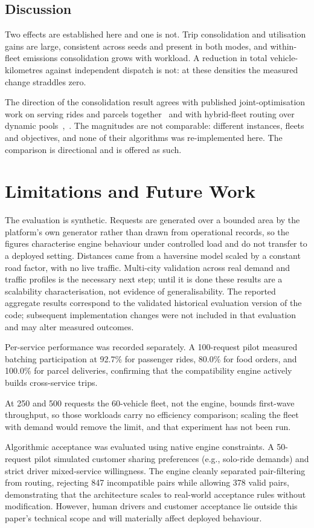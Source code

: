 \documentclass[conference]{IEEEtran}
\begin{document}
\subsection{Discussion}
Two effects are established here and one is not. Trip consolidation and utilisation gains are large, consistent across seeds and present in both modes, and within-fleet emissions consolidation grows with workload. A reduction in total vehicle-kilometres against independent dispatch is not: at these densities the measured change straddles zero.

The direction of the consolidation result agrees with published joint-optimisation work on serving rides and parcels together~\cite{ref3} and with hybrid-fleet routing over dynamic pools~\cite{ref9},~\cite{ref10}. The magnitudes are not comparable: different instances, fleets and objectives, and none of their algorithms was re-implemented here. The comparison is directional and is offered as such.

\section{Limitations and Future Work}
The evaluation is synthetic. Requests are generated over a bounded area by the platform's own generator rather than drawn from operational records, so the figures characterise engine behaviour under controlled load and do not transfer to a deployed setting. Distances came from a haversine model scaled by a constant road factor, with no live traffic. Multi-city validation across real demand and traffic profiles is the necessary next step; until it is done these results are a scalability characterisation, not evidence of generalisability. The reported aggregate results correspond to the validated historical evaluation version of the code; subsequent implementation changes were not included in that evaluation and may alter measured outcomes.

Per-service performance was recorded separately. A 100-request pilot measured batching participation at 92.7\% for passenger rides, 80.0\% for food orders, and 100.0\% for parcel deliveries, confirming that the compatibility engine actively builds cross-service trips.

At 250 and 500 requests the 60-vehicle fleet, not the engine, bounds first-wave throughput, so those workloads carry no efficiency comparison; scaling the fleet with demand would remove the limit, and that experiment has not been run.

Algorithmic acceptance was evaluated using native engine constraints. A 50-request pilot simulated customer sharing preferences (e.g., solo-ride demands) and strict driver mixed-service willingness. The engine cleanly separated pair-filtering from routing, rejecting 847 incompatible pairs while allowing 378 valid pairs, demonstrating that the architecture scales to real-world acceptance rules without modification. However, human drivers and customer acceptance lie outside this paper's technical scope and will materially affect deployed behaviour.
\end{document}
